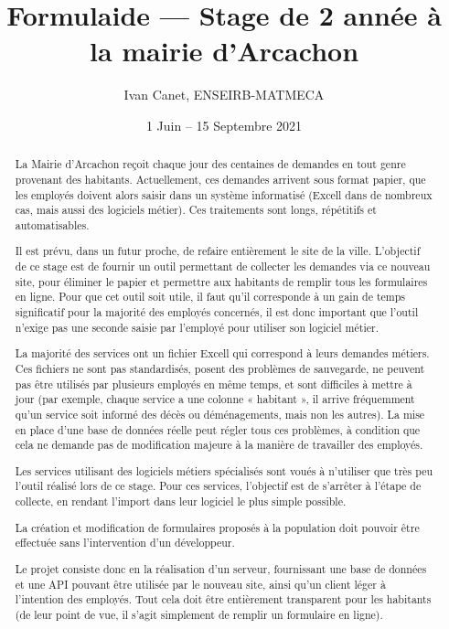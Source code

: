\documentclass[11pt,french]{memoir}
\begin{document}
	\renewcommand{\chaptername}{Partie}

	\frontmatter
	\title{Formulaide --- Stage de 2\ieme{} année à la mairie d'Arcachon}
	\date{1\ier{} Juin -- 15 Septembre 2021}
	\author{Ivan Canet, ENSEIRB-MATMECA}
	\maketitle

	\begin{abstract}
		La Mairie d’Arcachon reçoit chaque jour des centaines de demandes en tout genre provenant des habitants.
		Actuellement, ces demandes arrivent sous format papier, que les employés doivent alors saisir dans un système informatisé (Excell dans de nombreux cas, mais aussi des logiciels métier).
		Ces traitements sont longs, répétitifs et automatisables.

		Il est prévu, dans un futur proche, de refaire entièrement le site de la ville.
		L’objectif de ce stage est de fournir un outil permettant de collecter les demandes via ce nouveau site, pour éliminer le papier et permettre aux habitants de remplir tous les formulaires en ligne.
		Pour que cet outil soit utile, il faut qu’il corresponde à un gain de temps significatif pour la majorité des employés concernés, il est donc important que l’outil n’exige pas une seconde saisie par l’employé pour utiliser son logiciel métier.

		La majorité des services ont un fichier Excell qui correspond à leurs demandes métiers.
		Ces fichiers ne sont pas standardisés, posent des problèmes de sauvegarde, ne peuvent pas être utilisés par plusieurs employés en même temps, et sont difficiles à mettre à jour (par exemple, chaque service a une colonne « habitant », il arrive fréquemment qu’un service soit informé des décès ou déménagements, mais non les autres).
		La mise en place d’une base de données réelle peut régler tous ces problèmes, à condition que cela ne demande pas de modification majeure à la manière de travailler des employés.

		Les services utilisant des logiciels métiers spécialisés sont voués à n’utiliser que très peu l’outil réalisé lors de ce stage.
		Pour ces services, l’objectif est de s’arrêter à l’étape de collecte, en rendant l’import dans leur logiciel le plus simple possible.

		La création et modification de formulaires proposés à la population doit pouvoir être effectuée sans l’intervention d’un développeur.

		\uparagraph
		Le projet consiste donc en la réalisation d’un serveur, fournissant une base de données
		et une API pouvant être utilisée par le nouveau site, ainsi qu’un client léger à l’intention des
		employés.
		Tout cela doit être entièrement transparent pour les habitants (de leur point de vue,
		il s’agit simplement de remplir un formulaire en ligne).
	\end{abstract}
\end{document}
